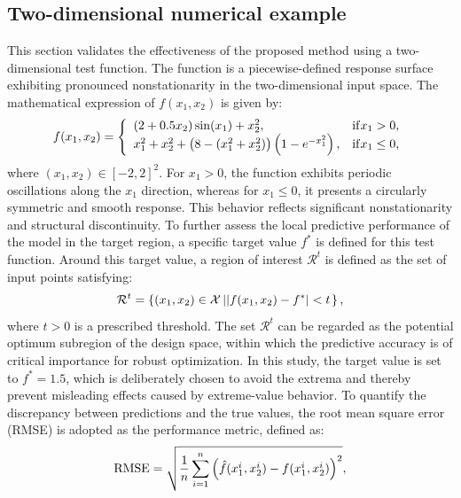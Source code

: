 \documentclass[]{interact}
\theoremstyle{plain}%
\theoremstyle{definition}
\theoremstyle{remark}
\begin{document}
\subsection{Two-dimensional numerical example}
This section validates the effectiveness of the proposed method using a two-dimensional test function. The function is a piecewise-defined response surface exhibiting pronounced nonstationarity in the two-dimensional input space. The mathematical expression of $f(x_{1}, x_{2})$ is given by:
\begin{equation}
	f({x_1},{x_2}) = \left\{ {\begin{array}{*{20}{l}}
			{(2 + 0.5{x_2})\sin ({x_1}) + x_2^2,}&{{\rm{if  }}{x_1} > 0},\\
			{x_1^2 + x_2^2 + \left( {8 - (x_1^2 + x_2^2)} \right)\left( {1 - {e^{ - x_1^2}}} \right),}&{{\rm{if  }}{x_1} \le 0},
	\end{array}} \right.
\end{equation}
where $(x_{1}, x_{2}) \in [-2, 2]^{2}$. For $x_{1} > 0$, the function exhibits periodic oscillations along the $x_{1}$ direction, whereas for $x_{1} \le 0$, it presents a circularly symmetric and smooth response. This behavior reflects significant nonstationarity and structural discontinuity. To further assess the local predictive performance of the model in the target region, a specific target value $f^{*}$ is defined for this test function. Around this target value, a region of interest ${\mathcal{R}}^{t}$ is defined as the set of input points satisfying: 
\begin{equation}
	{{\cal R}^t} = \left\{ {({x_1},{x_2}) \in {\cal X}\left| {\left| {f({x_1},{x_2}) - {f^*}} \right| < t} \right.} \right\},
\end{equation}
where $t > 0$ is a prescribed threshold. The set ${\mathcal{R}}^{t}$ can be regarded as the potential optimum subregion of the design space, within which the predictive accuracy is of critical importance for robust optimization. In this study, the target value is set to $f^{*} = 1.5$, which is deliberately chosen to avoid the extrema and thereby prevent misleading effects caused by extreme-value behavior. To quantify the discrepancy between predictions and the true values, the root mean square error (RMSE) is adopted as the performance metric, defined as:
\begin{equation}
	{\rm{RMSE}} = \sqrt {\frac{1}{n}\sum\limits_{i = 1}^n {{{\left( {\hat f(x_1^i,x_2^i) - f(x_1^i,x_2^i)} \right)}^2}} } ,
\end{equation}
\end{document}
